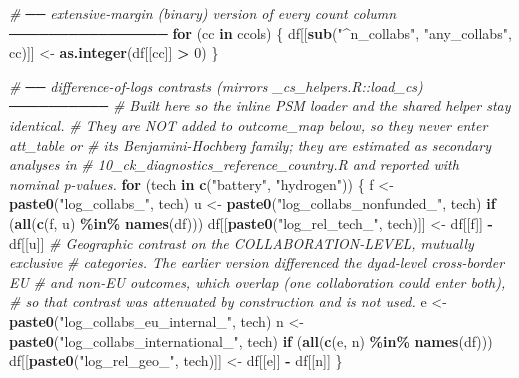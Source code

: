 \documentclass[
]{article}
\newenvironment{Shaded}{\begin{snugshade}}{\end{snugshade}}
\newcommand{\CommentTok}[1]{\textcolor[rgb]{0.56,0.35,0.01}{\textit{#1}}}
\newcommand{\ControlFlowTok}[1]{\textcolor[rgb]{0.13,0.29,0.53}{\textbf{#1}}}
\newcommand{\DecValTok}[1]{\textcolor[rgb]{0.00,0.00,0.81}{#1}}
\newcommand{\FunctionTok}[1]{\textcolor[rgb]{0.13,0.29,0.53}{\textbf{#1}}}
\newcommand{\NormalTok}[1]{#1}
\newcommand{\OtherTok}[1]{\textcolor[rgb]{0.56,0.35,0.01}{#1}}
\newcommand{\SpecialCharTok}[1]{\textcolor[rgb]{0.81,0.36,0.00}{\textbf{#1}}}
\newcommand{\StringTok}[1]{\textcolor[rgb]{0.31,0.60,0.02}{#1}}
\begin{document}
\begin{Shaded}
\begin{Highlighting}[]
  \CommentTok{\# ── extensive{-}margin (binary) version of every count column ────────────────}
  \ControlFlowTok{for}\NormalTok{ (cc }\ControlFlowTok{in}\NormalTok{ ccols) \{}
\NormalTok{    df[[}\FunctionTok{sub}\NormalTok{(}\StringTok{"\^{}n\_collabs"}\NormalTok{, }\StringTok{"any\_collabs"}\NormalTok{, cc)]] }\OtherTok{\textless{}{-}} \FunctionTok{as.integer}\NormalTok{(df[[cc]] }\SpecialCharTok{\textgreater{}} \DecValTok{0}\NormalTok{)}
\NormalTok{  \}}

  \CommentTok{\# ── difference{-}of{-}logs contrasts (mirrors \_cs\_helpers.R::load\_cs) ──────────}
  \CommentTok{\# Built here so the inline PSM loader and the shared helper stay identical.}
  \CommentTok{\# They are NOT added to outcome\_map below, so they never enter att\_table or}
  \CommentTok{\# its Benjamini{-}Hochberg family; they are estimated as secondary analyses in}
  \CommentTok{\# 10\_ck\_diagnostics\_reference\_country.R and reported with nominal p{-}values.}
  \ControlFlowTok{for}\NormalTok{ (tech }\ControlFlowTok{in} \FunctionTok{c}\NormalTok{(}\StringTok{"battery"}\NormalTok{, }\StringTok{"hydrogen"}\NormalTok{)) \{}
\NormalTok{    f }\OtherTok{\textless{}{-}} \FunctionTok{paste0}\NormalTok{(}\StringTok{"log\_collabs\_"}\NormalTok{, tech)}
\NormalTok{    u }\OtherTok{\textless{}{-}} \FunctionTok{paste0}\NormalTok{(}\StringTok{"log\_collabs\_nonfunded\_"}\NormalTok{, tech)}
    \ControlFlowTok{if}\NormalTok{ (}\FunctionTok{all}\NormalTok{(}\FunctionTok{c}\NormalTok{(f, u) }\SpecialCharTok{\%in\%} \FunctionTok{names}\NormalTok{(df)))}
\NormalTok{      df[[}\FunctionTok{paste0}\NormalTok{(}\StringTok{"log\_rel\_tech\_"}\NormalTok{, tech)]] }\OtherTok{\textless{}{-}}\NormalTok{ df[[f]] }\SpecialCharTok{{-}}\NormalTok{ df[[u]]}
    \CommentTok{\# Geographic contrast on the COLLABORATION{-}LEVEL, mutually exclusive}
    \CommentTok{\# categories. The earlier version differenced the dyad{-}level cross{-}border EU}
    \CommentTok{\# and non{-}EU outcomes, which overlap (one collaboration could enter both),}
    \CommentTok{\# so that contrast was attenuated by construction and is not used.}
\NormalTok{    e }\OtherTok{\textless{}{-}} \FunctionTok{paste0}\NormalTok{(}\StringTok{"log\_collabs\_eu\_internal\_"}\NormalTok{, tech)}
\NormalTok{    n }\OtherTok{\textless{}{-}} \FunctionTok{paste0}\NormalTok{(}\StringTok{"log\_collabs\_international\_"}\NormalTok{, tech)}
    \ControlFlowTok{if}\NormalTok{ (}\FunctionTok{all}\NormalTok{(}\FunctionTok{c}\NormalTok{(e, n) }\SpecialCharTok{\%in\%} \FunctionTok{names}\NormalTok{(df)))}
\NormalTok{      df[[}\FunctionTok{paste0}\NormalTok{(}\StringTok{"log\_rel\_geo\_"}\NormalTok{, tech)]] }\OtherTok{\textless{}{-}}\NormalTok{ df[[e]] }\SpecialCharTok{{-}}\NormalTok{ df[[n]]}
\NormalTok{  \}}


\end{Highlighting}
\end{Shaded}
\end{document}

